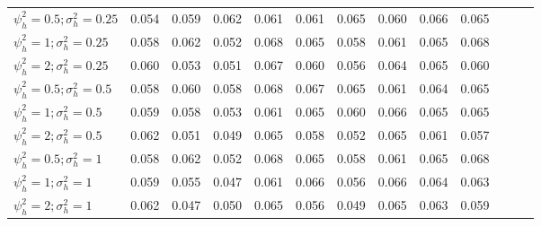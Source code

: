 \begin{table}[ht]
{\begin{tabular}{l c c c c c c c c c c c c}
\hline
$\psi_h^2 = 0.5; \sigma_h^2 = 0.25$ & 0.054 & 0.059 & 0.062 & 0.061 & 0.061 & 0.065 & 0.060 & 0.066 & 0.065 \\
$\psi_h^2 = 1; \sigma_h^2 = 0.25$ & 0.058 & 0.062 & 0.052 & 0.068 & 0.065 & 0.058 & 0.061 & 0.065 & 0.068 \\
$\psi_h^2 = 2; \sigma_h^2 = 0.25$ & 0.060 & 0.053 & 0.051 & 0.067 & 0.060 & 0.056 & 0.064 & 0.065 & 0.060 \\
$\psi_h^2 = 0.5; \sigma_h^2 = 0.5$ & 0.058 & 0.060 & 0.058 & 0.068 & 0.067 & 0.065 & 0.061 & 0.064 & 0.065 \\
$\psi_h^2 = 1; \sigma_h^2 = 0.5$ & 0.059 & 0.058 & 0.053 & 0.061 & 0.065 & 0.060 & 0.066 & 0.065 & 0.065 \\
$\psi_h^2 = 2; \sigma_h^2 = 0.5$ & 0.062 & 0.051 & 0.049 & 0.065 & 0.058 & 0.052 & 0.065 & 0.061 & 0.057 \\
$\psi_h^2 = 0.5; \sigma_h^2 = 1$ & 0.058 & 0.062 & 0.052 & 0.068 & 0.065 & 0.058 & 0.061 & 0.065 & 0.068 \\
$\psi_h^2 = 1; \sigma_h^2 = 1$ & 0.059 & 0.055 & 0.047 & 0.061 & 0.066 & 0.056 & 0.066 & 0.064 & 0.063 \\
$\psi_h^2 = 2; \sigma_h^2 = 1$ & 0.062 & 0.047 & 0.050 & 0.065 & 0.056 & 0.049 & 0.065 & 0.063 & 0.059 \\
\bottomrule
\end{tabular}}
\end{table}


